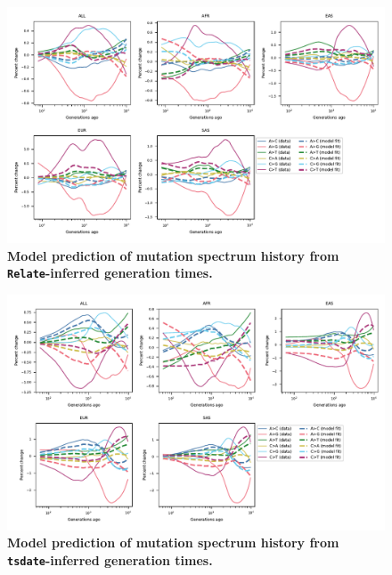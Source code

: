 \documentclass[]{article}
\newcommand{\tsdate}{\texttt{tsdate}\xspace}
\newcommand{\relate}{\texttt{Relate}\xspace}
\begin{document}
\begin{figure}[ht!]
    \centering
    \includegraphics[width=\textwidth]{../plots/goodness-of-fit.DM.relate.max_age.10000.pdf}
    \caption{
        \textbf{Model prediction of mutation spectrum history from
        \relate-inferred generation times.}
    }
    \label{fig:relate-fit}
\end{figure}


\begin{figure}[ht!]
    \centering
    \includegraphics[width=\textwidth]{../plots/goodness-of-fit.DM.tsdate.max_age.10000.pdf}
    \caption{
        \textbf{Model prediction of mutation spectrum history from
        \tsdate-inferred generation times.}
    }
    \label{fig:tsdate-fit}
\end{figure}
\end{document}
